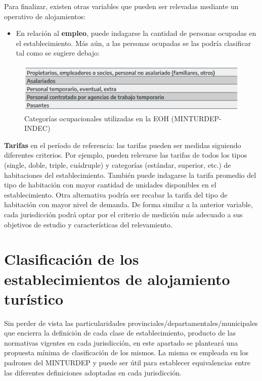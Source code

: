 \documentclass[
]{book}
\providecommand{\tightlist}{%
  \setlength{\itemsep}{0pt}\setlength{\parskip}{0pt}}
\begin{document}
Para finalizar, existen otras variables que pueden ser relevadas mediante un operativo de alojamientos:

\begin{itemize}
\tightlist
\item
  En relación al \textbf{empleo}, puede indagarse la cantidad de personas ocupadas en el establecimiento. Más aún, a las personas ocupadas se las podría clasificar tal como se sugiere debajo:
\end{itemize}

\begin{figure}

{\centering \includegraphics[width=0.8\linewidth]{imagenes/tabla_5} 

}

\caption{Categorías ocupacionales utilizadas en la EOH (MINTURDEP-INDEC)}\label{fig:ocupados}
\end{figure}

\textbf{Tarifas} en el período de referencia: las tarifas pueden ser medidas siguiendo diferentes criterios. Por ejemplo, pueden relevarse las tarifas de todos los tipos (single, doble, triple, cuádruple) y categorías (estándar, superior, etc.) de habitaciones del establecimiento. También puede indagarse la tarifa promedio del tipo de habitación con mayor cantidad de unidades disponibles en el establecimiento. Otra alternativa podría ser recabar la tarifa del tipo de habitación con mayor nivel de demanda. De forma similar a la anterior variable, cada jurisdicción podrá optar por el criterio de medición más adecuado a sus objetivos de estudio y características del relevamiento.\\

\hypertarget{clasificaciuxf3n-de-los-establecimientos-de-alojamiento-turuxedstico}{%
\section{Clasificación de los establecimientos de alojamiento turístico}\label{clasificaciuxf3n-de-los-establecimientos-de-alojamiento-turuxedstico}}

Sin perder de vista las particularidades provinciales/departamentales/municipales que encierra la definición de cada clase de establecimiento, producto de las normativas vigentes en cada jurisdicción, en este apartado se planteará una propuesta mínima de clasificación de los mismos. La misma es empleada en los padrones del MINTURDEP y puede ser útil para establecer equivalencias entre las diferentes definiciones adoptadas en cada jurisdicción.
\end{document}
